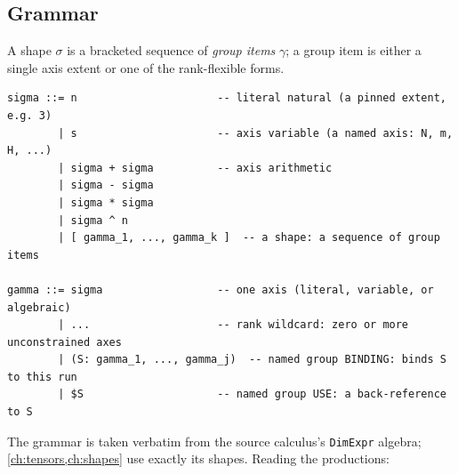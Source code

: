 \subsection{Grammar}
\label{sec:b-grammar}

A shape $\sigma$ is a bracketed sequence of \emph{group items} $\gamma$; a group
item is either a single axis extent or one of the rank-flexible forms.

\begin{lstlisting}[style=l4style]
sigma ::= n                      -- literal natural (a pinned extent, e.g. 3)
        | s                      -- axis variable (a named axis: N, m, H, ...)
        | sigma + sigma          -- axis arithmetic
        | sigma - sigma
        | sigma * sigma
        | sigma ^ n
        | [ gamma_1, ..., gamma_k ]  -- a shape: a sequence of group items

gamma ::= sigma                  -- one axis (literal, variable, or algebraic)
        | ...                    -- rank wildcard: zero or more unconstrained axes
        | (S: gamma_1, ..., gamma_j)  -- named group BINDING: binds S to this run
        | $S                     -- named group USE: a back-reference to S
\end{lstlisting}

\noindent The grammar is taken verbatim from the source calculus's
\lstinline[style=l4style]|DimExpr| algebra; \cref{ch:tensors,ch:shapes} use exactly
its shapes. Reading the productions:

